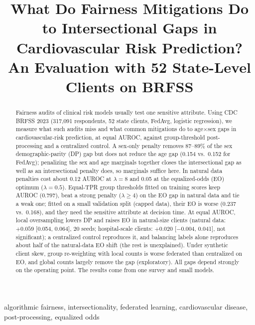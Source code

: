 \documentclass[conference]{IEEEtran}
\begin{document}
\title{What Do Fairness Mitigations Do to Intersectional Gaps in Cardiovascular Risk Prediction? An Evaluation with 52 State-Level Clients on BRFSS}
\author{
}
\maketitle

\begin{abstract}
Fairness audits of clinical risk models usually test one sensitive attribute. Using CDC BRFSS 2023 (317,091 respondents, 52 state clients, FedAvg, logistic regression), we measure what such audits miss and what common mitigations do to age$\times$sex gaps in cardiovascular-risk prediction, at equal AUROC, against group-threshold post-processing and a centralized control. A sex-only penalty removes 87--89\% of the sex demographic-parity (DP) gap but does not reduce the age gap (0.154 vs.\ 0.152 for FedAvg); penalizing the sex and age marginals together closes the intersectional gap as well as an intersectional penalty does, so marginals suffice here. In natural data penalties cost about 0.12 AUROC at $\lambda{=}8$ and 0.05 at the equalized-odds (EO) optimum ($\lambda{=}0.5$). Equal-TPR group thresholds fitted on training scores keep AUROC (0.797), beat a strong penalty ($\lambda{\ge}4$) on the EO gap in natural data and tie a weak one; fitted on a small validation split (capped data), their EO is worse (0.237 vs.\ 0.168), and they need the sensitive attribute at decision time. At equal AUROC, local oversampling lowers DP and raises EO in natural-size clients (natural data: $+0.059$ [0.054, 0.064], 20 seeds; hospital-scale clients: $+0.020$ [$-$0.004, 0.041], not significant); a centralized control reproduces it, and balancing labels alone reproduces about half of the natural-data EO shift (the rest is unexplained). Under synthetic client skew, group re-weighting with local counts is worse federated than centralized on EO, and global counts largely remove the gap (exploratory). All gaps depend strongly on the operating point. The results come from one survey and small models.
\end{abstract}

\begin{IEEEkeywords}
algorithmic fairness, intersectionality, federated learning, cardiovascular disease, post-processing, equalized odds
\end{IEEEkeywords}
\end{document}
